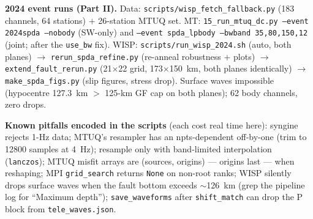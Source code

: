 \documentclass[11pt]{article}
\begin{document}
\textbf{2024 event runs (Part II).} Data: \texttt{scripts/wisp\_fetch\_fallback.py} (183
channels, 64 stations) $+$ 26-station MTUQ set. MT: \texttt{15\_run\_mtuq\_dc.py --event
2024spda --nobody} (SW-only) and \texttt{--event spda\_lpbody --bwband 35,80,150,12} (joint;
after the \texttt{use\_bw} fix). WISP: \texttt{scripts/run\_wisp\_2024.sh} (auto, both
planes) $\to$ \texttt{rerun\_spda\_refine.py} (re-anneal robustness $+$ plots) $\to$
\texttt{extend\_fault\_rerun.py} (21$\times$22 grid, 173$\times$150~km, both planes
identically) $\to$ \texttt{make\_spda\_figs.py} (slip figures, stress drop). Surface waves
impossible (hypocentre 127.3~km $>$ 125-km GF cap on both planes); 62 body channels, zero
drops.

\textbf{Known pitfalls encoded in the scripts} (each cost real time here): syngine rejects
1-Hz data; MTUQ's resampler has an npts-dependent off-by-one (trim to 12800 samples at 4~Hz);
resample only with band-limited interpolation (\texttt{lanczos}); MTUQ misfit arrays are
(sources, origins) --- origins last --- when reshaping; MPI \texttt{grid\_search} returns
\texttt{None} on non-root ranks; WISP silently drops surface waves when the fault bottom
exceeds $\sim$126~km (grep the pipeline log for ``Maximum depth''); \texttt{save\_waveforms}
after \texttt{shift\_match} can drop the P block from \texttt{tele\_waves.json}.
\end{document}
